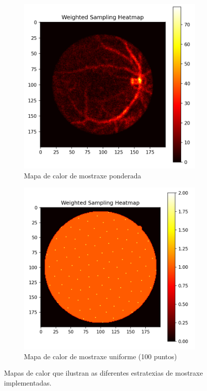 \begin{figure}[tbp]
\begin{subfigure}[b]{0.3\textwidth}
        \includegraphics[width=\textwidth]{imaxes/muestraje/weighted_sampling_heatmap.png}
        \caption{Mapa de calor de mostraxe ponderada}
        \label{fig:weighted_sampling_heatmap}
    \end{subfigure}
    \hfill
    \begin{subfigure}[b]{0.3\textwidth}
        \centering
        \includegraphics[width=\textwidth]{imaxes/muestraje/uniform_sampling_heatmap.png}
        \caption{Mapa de calor de mostraxe uniforme (100 puntos)}
        \label{fig:uniform_sampling_heatmap}
    \end{subfigure}
    \caption{Mapas de calor que ilustran as diferentes estratexias de mostraxe implementadas.}
    \label{fig:sampling_heatmaps}
\end{figure}

